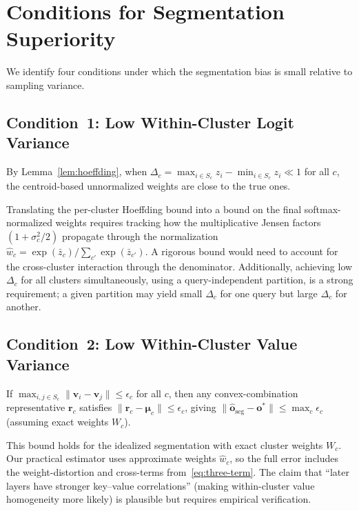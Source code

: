 \documentclass[11pt,a4paper]{article}
\theoremstyle{definition}
\newcommand{\vv}{\mathbf{v}}
\newcommand{\oo}{\mathbf{o}}
\newcommand{\rr}{\mathbf{r}}
\newcommand{\bmu}{\boldsymbol{\mu}}
\begin{document}
\section{Conditions for Segmentation Superiority}\label{sec:conditions}

We identify four conditions under which the segmentation bias is small
relative to sampling variance.

\subsection{Condition~1: Low Within-Cluster Logit Variance}

By Lemma~\ref{lem:hoeffding}, when
$\Delta_c = \max_{i\in S_c}z_i - \min_{i\in S_c}z_i \ll 1$ for all $c$,
the centroid-based unnormalized weights are close to the true ones.

\begin{researchnote}
Translating the per-cluster Hoeffding bound into a bound on the final
softmax-normalized weights requires tracking how the multiplicative Jensen
factors $(1+\sigma_c^2/2)$ propagate through the normalization
$\hat{w}_c = \exp(\bar{z}_c)/\sum_{c'}\exp(\bar{z}_{c'})$.  A rigorous bound
would need to account for the cross-cluster interaction through the
denominator.  Additionally, achieving low $\Delta_c$ for all clusters
simultaneously, using a query-independent partition, is a strong requirement;
a given partition may yield small $\Delta_c$ for one query but large $\Delta_c$
for another.
\end{researchnote}

\subsection{Condition~2: Low Within-Cluster Value Variance}

If $\max_{i,j\in S_c}\|\vv_i-\vv_j\|\le\epsilon_c$ for all $c$, then any
convex-combination representative $\rr_c$ satisfies
$\|\rr_c-\bmu_c\|\le\epsilon_c$, giving
$\|\hat{\oo}_{\mathrm{seg}}-\oo^*\|\le\max_c\epsilon_c$
(assuming exact weights $W_c$).

\begin{researchnote}
This bound holds for the idealized segmentation with exact cluster weights
$W_c$.  Our practical estimator uses approximate weights $\hat{w}_c$, so
the full error includes the weight-distortion and cross-terms
from~\eqref{eq:three-term}.  The claim that ``later layers have stronger
key--value correlations'' (making within-cluster value homogeneity more likely)
is plausible but requires empirical verification.
\end{researchnote}
\end{document}
